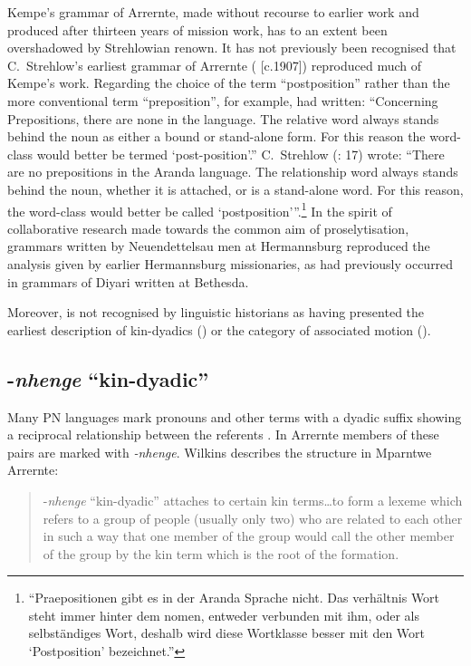 Kempe's grammar of Arrernte, made without recourse to earlier work and produced after thirteen years of mission work, has to an extent been overshadowed by Strehlowian renown. It has not previously been recognised that C.~Strehlow’s earliest grammar of Arrernte (\citeyear{strehlow_untitled_1931} [c.1907]) reproduced much of Kempe’s work. Regarding the choice of the term “postposition” rather than the more conventional term “preposition'', for example, \citet[4]{kempe_grammar_1891} had written: “Concerning Prepositions, there are none in the language. The relative word always stands behind the noun as either a bound or stand-alone form. For this reason the word-class would better be termed `post-position’.” C.~Strehlow (\citeyear{strehlow_untitled_1931}: 17) wrote: “There are no prepositions in the Aranda language. The relationship word always stands behind the noun, whether it is attached, or is a stand-alone word. For this reason, the word-class would better be called `postposition’\thinspace”.\footnote{“Praepositionen gibt es in der Aranda Sprache nicht. Das verhältnis Wort steht immer hinter dem nomen, entweder verbunden mit ihm, oder als selbständiges Wort, deshalb wird diese Wortklasse besser mit den Wort `Postposition' bezeichnet.”} In the spirit of collaborative research made towards the common aim of proselytisation, grammars written by Neuendettelsau men at Hermannsburg reproduced the analysis given by earlier Hermannsburg missionaries, as had previously occurred in grammars of Diyari written at Bethesda.

Moreover, \citet{kempe_grammar_1891} is not recognised by linguistic historians as having presented the earliest description of kin-dyadics () or the category of associated motion ().

\subsection{{}-\textit{nhenge} ``kin-{dyadic}''}
\label{sec:key:9.3.1}\label{bkm:Ref463530241}

Many PN languages mark pronouns and other terms with a dyadic suffix showing a reciprocal relationship between the referents \citep{MerlanHeath1982}. In Arrernte members of these pairs are marked with \textit{{}-nhenge}. Wilkins describes the structure in Mparntwe Arrernte:

\begin{quote}

 {}-\textit{nhenge} “kin-dyadic” attaches to certain kin terms…to form a lexeme which refers to a group of people (usually only two) who are related to each other in such a way that one member of the group would call the other member of the group by the kin term which is the root of the formation. \citep[136]{wilkins_mparntwe_1989}
\end{quote}

